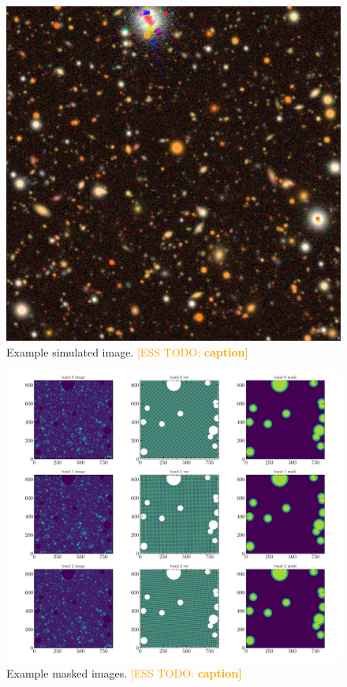 \documentclass[iop, twocolappendix, appendixfloats, numberedappendix, apj]{hackemulateapj}
\newcommand{\esstodo}[1]{\textcolor{orange}{[ESS TODO: \bf #1]}}
\begin{document}
\begin{figure}
    \includegraphics[width=\columnwidth]{example-image.jpg}
    \caption{
        Example simulated image. \esstodo{caption}
    }
\end{figure}
\begin{figure}
    \includegraphics[width=\columnwidth]{example-masked-image.pdf}
    \caption{
        Example masked images. \esstodo{caption}
    }
\end{figure}
\end{document}
